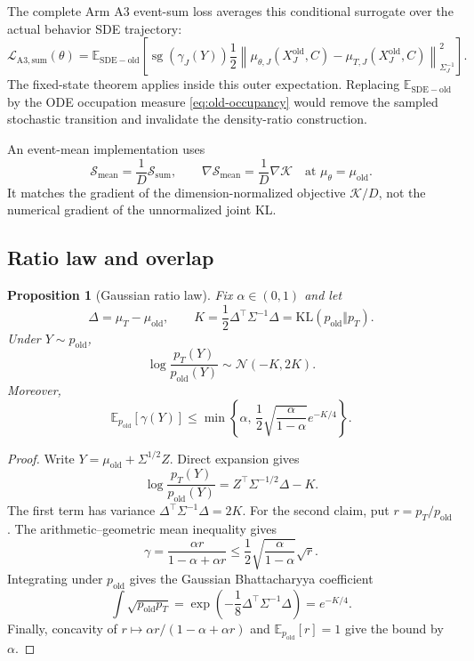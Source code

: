 \documentclass[11pt,a4paper]{article}
\newcommand{\E}{\mathbb{E}}
\newcommand{\N}{\mathcal{N}}
\newcommand{\KL}{\mathrm{KL}}
\newcommand{\norm}[1]{\left\lVert #1 \right\rVert}
\newcommand{\sg}{\operatorname{sg}}
\theoremstyle{plain}
\newtheorem{proposition}[theorem]{Proposition}
\theoremstyle{definition}
\begin{document}
The complete Arm A3 event-sum loss averages this conditional surrogate over the actual behavior
SDE trajectory:
\begin{equation}
\mathcal L_{\mathrm{A3,sum}}(\theta)
=
\E_{\mathrm{SDE-old}}\!\left[
  \sg(\gamma_J(Y))
  \frac12
  \norm{
    \mu_{\theta,J}(X_J^{\mathrm{old}},C)
    -\mu_{T,J}(X_J^{\mathrm{old}},C)
  }_{\Sigma_J^{-1}}^2
\right].
\label{eq:a3-arm-loss}
\end{equation}
The fixed-state theorem applies inside this outer expectation.  Replacing
$\E_{\mathrm{SDE-old}}$ by the ODE occupation measure \eqref{eq:old-occupancy} would remove the
sampled stochastic transition and invalidate the density-ratio construction.

An event-mean implementation uses
\begin{equation}
\mathcal S_{\mathrm{mean}}=\frac{1}{D}\mathcal S_{\mathrm{sum}},
\qquad
\nabla\mathcal S_{\mathrm{mean}}
=
\frac1D\nabla\mathcal K
\quad\text{at }\mu_\theta=\mu_{\mathrm{old}}.
\label{eq:a3-mean-gradient}
\end{equation}
It matches the gradient of the dimension-normalized objective $\mathcal K/D$, not the numerical
gradient of the unnormalized joint KL.

\subsection{Ratio law and overlap}

\begin{proposition}[Gaussian ratio law]
\label{prop:a3-ratio-law}
Fix $\alpha\in(0,1)$ and let
\begin{equation}
\Delta=\mu_T-\mu_{\mathrm{old}},
\qquad
K=\frac12\Delta^\top\Sigma^{-1}\Delta
=\KL(p_{\mathrm{old}}\Vert p_T).
\label{eq:a3-K}
\end{equation}
Under $Y\sim p_{\mathrm{old}}$,
\begin{equation}
\log\frac{p_T(Y)}{p_{\mathrm{old}}(Y)}
\sim\N(-K,2K).
\label{eq:a3-ratio-law}
\end{equation}
Moreover,
\begin{equation}
\E_{p_{\mathrm{old}}}[\gamma(Y)]
\le
\min\!\left\{
\alpha,\,
\frac12\sqrt{\frac{\alpha}{1-\alpha}}e^{-K/4}
\right\}.
\label{eq:a3-overlap-bound}
\end{equation}
\end{proposition}

\begin{proof}
Write $Y=\mu_{\mathrm{old}}+\Sigma^{1/2}Z$.  Direct expansion gives
\[
\log\frac{p_T(Y)}{p_{\mathrm{old}}(Y)}
=Z^\top\Sigma^{-1/2}\Delta-K.
\]
The first term has variance $\Delta^\top\Sigma^{-1}\Delta=2K$.  For the second claim, put
$r=p_T/p_{\mathrm{old}}$.  The arithmetic--geometric mean inequality gives
\[
\gamma
=\frac{\alpha r}{1-\alpha+\alpha r}
\le
\frac12\sqrt{\frac{\alpha}{1-\alpha}}\sqrt r.
\]
Integrating under $p_{\mathrm{old}}$ gives the Gaussian Bhattacharyya coefficient
\[
\int\sqrt{p_{\mathrm{old}}p_T}
=
\exp\!\left(-\frac18\Delta^\top\Sigma^{-1}\Delta\right)
=e^{-K/4}.
\]
Finally, concavity of
$r\mapsto\alpha r/(1-\alpha+\alpha r)$ and $\E_{p_{\mathrm{old}}}[r]=1$
give the bound by $\alpha$.
\end{proof}
\end{document}
